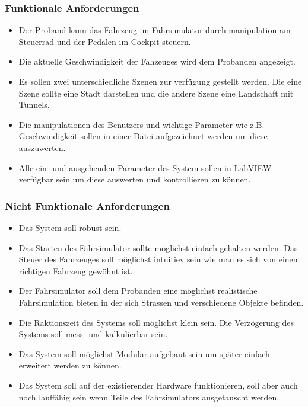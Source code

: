 \subsubsection{Funktionale Anforderungen}
\begin{itemize}
\item Der Proband kann das Fahrzeug im Fahrsimulator durch manipulation am Steuerrad und der Pedalen im Cockpit steuern.
\item Die aktuelle Geschwindigkeit der Fahzeuges wird dem Probanden angezeigt.
\item Es sollen zwei unterschiedliche Szenen zur verfügung gestellt werden.  Die eine Szene sollte eine Stadt darstellen und die andere Szene eine Landschaft mit Tunnels.
\item Die manipulationen des Benutzers und wichtige Parameter wie z.B. Geschwindigkeit sollen in einer Datei aufgezeichnet werden um diese auszuwerten.
\item Alle ein- und ausgehenden Parameter des System sollen in LabVIEW verfügbar sein um diese auswerten und kontrollieren zu können. 
\end{itemize}

\subsubsection {Nicht Funktionale Anforderungen}
\renewcommand{\labelenumi}{\alph{enumi})}

\begin{itemize}
\item Das System soll robust sein. 
\item Das Starten des Fahrsimulator sollte möglichst einfach gehalten werden. Das Steuer des Fahrzeuges soll möglichst intuitiev sein wie man es sich von einem richtigen Fahrzeug gewöhnt ist. 
\item Der Fahrsimulator soll dem Probanden eine möglichst realistische Fahrsimulation bieten in der sich Strassen und verschiedene Objekte befinden.
\item Die Raktionszeit des Systems soll möglichst klein sein. Die Verzögerung des Systems soll mess-  und kalkulierbar sein.
\item Das System soll möglichst Modular aufgebaut sein um später einfach erweitert werden zu können.
\item Das System soll auf der existierender Hardware funktionieren, soll aber auch noch lauffähig sein wenn Teile des Fahrsimulators ausgetauscht werden. 
\end{itemize}
